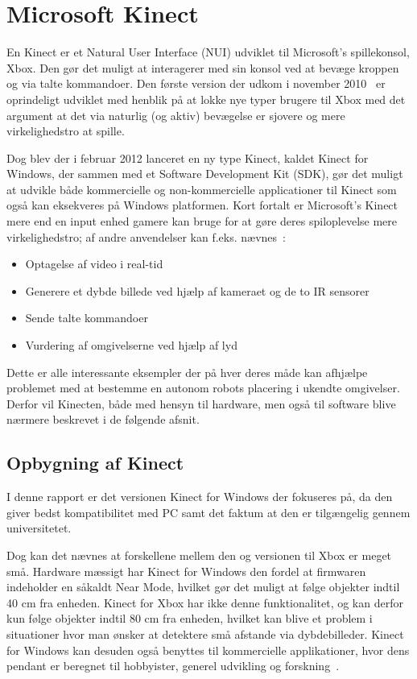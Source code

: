 \section{Microsoft Kinect}
En Kinect er et Natural User Interface (NUI) udviklet til Microsoft's spillekonsol, Xbox.
Den gør det muligt at interagerer med sin konsol ved at bevæge kroppen og via talte kommandoer.
Den første version der udkom i november 2010~\cite{kinectWiki} er oprindeligt udviklet med henblik på at lokke nye typer brugere til Xbox med det argument at det via naturlig (og aktiv) bevægelse er sjovere og mere virkelighedstro at spille.

Dog blev der i februar 2012 lanceret en ny type Kinect, kaldet Kinect for Windows, der sammen med et Software Development Kit (SDK), gør det muligt at udvikle både kommercielle og non-kommercielle applicationer til Kinect som også kan eksekveres på Windows platformen.
Kort fortalt er Microsoft's Kinect mere end en input enhed gamere kan bruge for at gøre deres spiloplevelse mere virkelighedstro; af andre anvendelser kan f.eks. nævnes~\cite[s.~17]{kinectProgrammingGuide}:

\begin{itemize}
\item Optagelse af video i real-tid
\item Generere et dybde billede ved hjælp af kameraet og de to IR sensorer
\item Sende talte kommandoer
\item Vurdering af omgivelserne ved hjælp af lyd
\end{itemize}

Dette er alle interessante eksempler der på hver deres måde kan afhjælpe problemet med at bestemme en autonom robots placering i ukendte omgivelser.
Derfor vil Kinecten, både med hensyn til hardware, men også til software blive nærmere beskrevet i de følgende afsnit.


\subsection{Opbygning af Kinect}
I denne rapport er det versionen Kinect for Windows der fokuseres på, da den giver bedst kompatibilitet med PC samt det faktum at den er tilgængelig gennem universitetet.

Dog kan det nævnes at forskellene mellem den og versionen til Xbox er meget små.
Hardware mæssigt har Kinect for Windows den fordel at firmwaren indeholder en såkaldt Near Mode, hvilket gør det muligt at følge objekter indtil 40 cm fra enheden.
Kinect for Xbox har ikke denne funktionalitet, og kan derfor kun følge objekter indtil 80 cm fra enheden, hvilket kan blive et problem i situationer hvor man ønsker at detektere små afstande via dybdebilleder.
Kinect for Windows kan desuden også benyttes til kommercielle applikationer, hvor dens pendant er beregnet til hobbyister, generel udvikling og forskning~\cite[s.~16]{kinectProgrammingGuide}.

